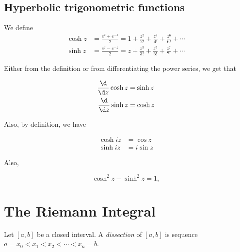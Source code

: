 \documentclass[a4paper]{article}
\begin{document}
\subsection{Hyperbolic trigonometric functions}
\begin{defi}
  We define
  \begin{align*}
    \cosh z &= \frac{e^z + e^{-z}}{2} = 1 + \frac{z^2}{2!} + \frac{z^4}{4!} + \frac{z^6}{6!} + \cdots\\
    \sinh z &= \frac{e^z - e^{-z}}{2} = z + \frac{z^3}{3!} + \frac{z^5}{5!} + \frac{z^7}{7!} + \cdots
  \end{align*}
\end{defi}

Either from the definition or from differentiating the power series, we get that
\begin{prop}
  \begin{align*}
    \frac{\d}{\d z}\cosh z &= \sinh z\\
    \frac{\d }{\d z}\sinh z &= \cosh z
  \end{align*}
\end{prop}
Also, by definition, we have
\begin{prop}
  \begin{align*}
    \cosh iz &= \cos z\\
    \sinh iz &= i\sin z
  \end{align*}
\end{prop}
Also,
\begin{prop}
  \[
    \cosh^2 z - \sinh^2 z = 1,
  \]
\end{prop}
\section{The Riemann Integral}
\begin{defi}[Dissections]
  Let $[a, b]$ be a closed interval. A \emph{dissection} of $[a, b]$ is sequence $a = x_0 < x_1 < x_2 < \cdots < x_n = b$.
\end{defi}
\end{document}
